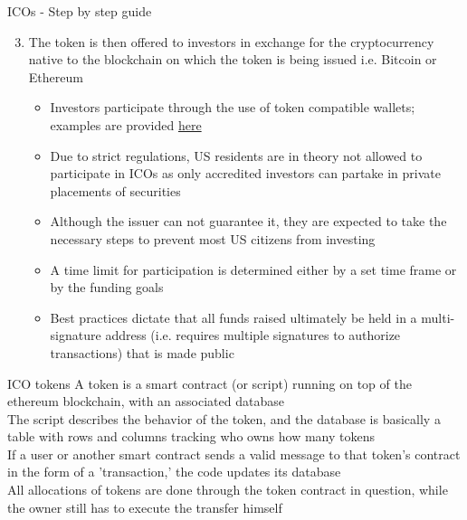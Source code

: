 \documentclass[9pt]{beamer}
\begin{document}

\begin{frame}{ICOs - Step by step guide}
	\begin{enumerate}
		\setcounter{enumi}{2}
		\item The token is then offered to investors in exchange for the cryptocurrency native to the blockchain on which the token is being issued i.e. Bitcoin or Ethereum
		\begin{itemize}
			\item Investors participate through the use of token compatible wallets; examples are provided \href{https://tokenmarket.net/what-is/how-to-participate-ethereum-token-crowdsale/}{here}
			\item Due to strict regulations, US residents are in theory not allowed to participate in ICOs as only accredited investors can partake in private placements of securities
			\item Although the issuer can not guarantee it, they are expected to take the necessary steps to prevent most US citizens from investing
			\item A time limit for participation is determined either by a set time frame or by the funding goals
			\item Best practices dictate that all funds raised ultimately be held in a multi-signature address (i.e. requires multiple signatures to authorize transactions) that is made public
		\end{itemize}
	\end{enumerate}
\end{frame}


\begin{frame}{ICO tokens}
	A token is a smart contract (or script) running on top of the ethereum blockchain, with an associated database\\ \vspace{3mm}
	The script describes the behavior of the token, and the database is basically a table with rows and columns tracking who owns how many tokens\\ \vspace{3mm}
	If a user or another smart contract sends a valid message to that token's contract in the form of a 'transaction,' the code updates its database\\ \vspace{3mm}
	All allocations of tokens are done through the token contract in question, while the owner still has to execute the transfer himself
\end{frame}
\end{document}
